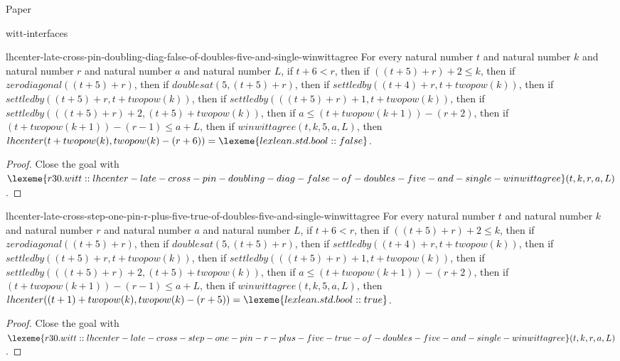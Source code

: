 \begin{lexlean}{Paper}
\begin{section}{witt-interfaces}
  \begin{theorem}{lhcenter-late-cross-pin-doubling-diag-false-of-doubles-five-and-single-winwittagree}
  For every natural number \(t\) and natural number \(k\) and natural number \(r\) and natural number \(a\) and natural number \(L\), if \(t + 6 < r\), then if \(((t + 5) + r) + 2 ≤ k\), then if \(zerodiagonal((t + 5) + r)\), then if \(doublesat(5, (t + 5) + r)\), then if \(settledby((t + 4) + r, t + twopow(k))\), then if \(settledby((t + 5) + r, t + twopow(k))\), then if \(settledby(((t + 5) + r) + 1, t + twopow(k))\), then if \(settledby(((t + 5) + r) + 2, (t + 5) + twopow(k))\), then if \(a ≤ (t + twopow(k + 1)) - (r + 2)\), then if \((t + twopow(k + 1)) - (r - 1) ≤ a + L\), then if \(winwittagree(t, k, 5, a, L)\), then \(lhcenter(t + twopow(k), twopow(k) - (r + 6)) = \lexeme{lexlean.std.bool::false}\).
  \begin{proof}
  Close the goal with \(\lexeme{r30.witt::lhcenter-late-cross-pin-doubling-diag-false-of-doubles-five-and-single-winwittagree}(t, k, r, a, L)\).
  \end{proof}
  \end{theorem}

  \begin{theorem}{lhcenter-late-cross-step-one-pin-r-plus-five-true-of-doubles-five-and-single-winwittagree}
  For every natural number \(t\) and natural number \(k\) and natural number \(r\) and natural number \(a\) and natural number \(L\), if \(t + 6 < r\), then if \(((t + 5) + r) + 2 ≤ k\), then if \(zerodiagonal((t + 5) + r)\), then if \(doublesat(5, (t + 5) + r)\), then if \(settledby((t + 4) + r, t + twopow(k))\), then if \(settledby((t + 5) + r, t + twopow(k))\), then if \(settledby(((t + 5) + r) + 1, t + twopow(k))\), then if \(settledby(((t + 5) + r) + 2, (t + 5) + twopow(k))\), then if \(a ≤ (t + twopow(k + 1)) - (r + 2)\), then if \((t + twopow(k + 1)) - (r - 1) ≤ a + L\), then if \(winwittagree(t, k, 5, a, L)\), then \(lhcenter((t + 1) + twopow(k), twopow(k) - (r + 5)) = \lexeme{lexlean.std.bool::true}\).
  \begin{proof}
  Close the goal with \(\lexeme{r30.witt::lhcenter-late-cross-step-one-pin-r-plus-five-true-of-doubles-five-and-single-winwittagree}(t, k, r, a, L)\).
  \end{proof}
  \end{theorem}


\end{section}
\end{lexlean}
